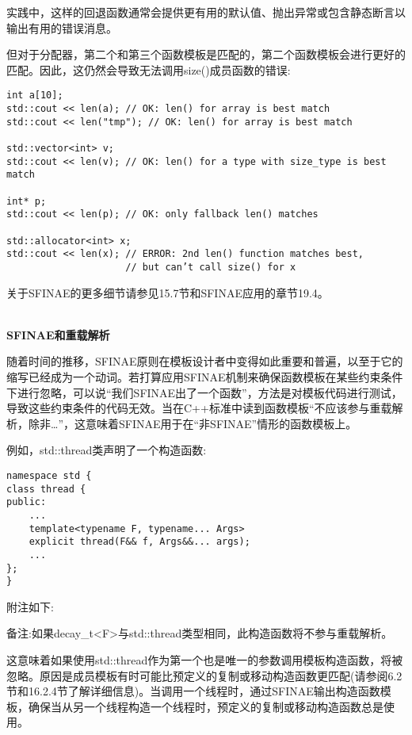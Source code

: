 \begin{tcolorbox}[colback=webgreen!5!white,colframe=webgreen!75!black]
\hspace*{0.75cm}实践中，这样的回退函数通常会提供更有用的默认值、抛出异常或包含静态断言以输出有用的错误消息。
\end{tcolorbox}

但对于分配器，第二个和第三个函数模板是匹配的，第二个函数模板会进行更好的匹配。因此，这仍然会导致无法调用size()成员函数的错误:

\begin{lstlisting}[style=styleCXX]
int a[10];
std::cout << len(a); // OK: len() for array is best match
std::cout << len("tmp"); // OK: len() for array is best match

std::vector<int> v;
std::cout << len(v); // OK: len() for a type with size_type is best match

int* p;
std::cout << len(p); // OK: only fallback len() matches

std::allocator<int> x;
std::cout << len(x); // ERROR: 2nd len() function matches best,
					 // but can’t call size() for x
\end{lstlisting}

关于SFINAE的更多细节请参见15.7节和SFINAE应用的章节19.4。

\hspace*{\fill} \\ %
\noindent
\textbf{SFINAE和重载解析}

随着时间的推移，SFINAE原则在模板设计者中变得如此重要和普遍，以至于它的缩写已经成为一个动词。若打算应用SFINAE机制来确保函数模板在某些约束条件下进行忽略，可以说“我们SFINAE出了一个函数”，方法是对模板代码进行测试，导致这些约束条件的代码无效。当在C++标准中读到函数模板“不应该参与重载解析，除非…”，这意味着SFINAE用于在“非SFINAE”情形的函数模板上。

例如，std::thread类声明了一个构造函数:

\begin{lstlisting}[style=styleCXX]
namespace std {
class thread {
public:
	...
	template<typename F, typename... Args>
	explicit thread(F&& f, Args&&... args);
	...
};
}
\end{lstlisting}

附注如下:

备注:如果decay\_t<F>与std::thread类型相同，此构造函数将不参与重载解析。

这意味着如果使用std::thread作为第一个也是唯一的参数调用模板构造函数，将被忽略。原因是成员模板有时可能比预定义的复制或移动构造函数更匹配(请参阅6.2节和16.2.4节了解详细信息)。当调用一个线程时，通过SFINAE输出构造函数模板，确保当从另一个线程构造一个线程时，预定义的复制或移动构造函数总是使用。

